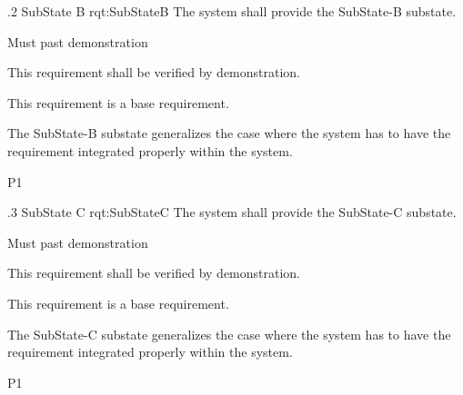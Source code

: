 \ONERQMTV
{\RqtNumberBase.2}
{SubState B}
{rqt:SubStateB}
{The system shall provide the SubState-B substate.}
{
	\item [Phase 1] Must past demonstration
}
{This requirement shall be verified by demonstration.}
{
	\item [N/A] This requirement is a base requirement.
}
{
	\item The SubState-B substate generalizes the case where the system has to have the requirement integrated properly within the system.
}
{P1}


\ONERQMTV
{\RqtNumberBase.3}
{SubState C}
{rqt:SubStateC}
{The system shall provide the SubState-C substate.}
{
	\item [Phase 1] Must past demonstration
}
{This requirement shall be verified by demonstration.}
{
	\item [N/A] This requirement is a base requirement.
}
{
	\item The SubState-C substate generalizes the case where the system has to have the requirement integrated properly within the system.
}
{P1}
